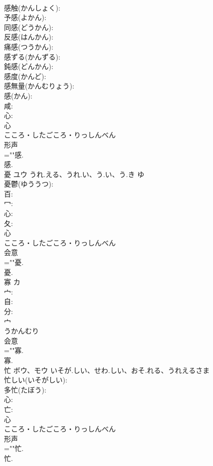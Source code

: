 \documentclass[8pt]{extreport}
\begin{document}
\begin{CJK}{UTF8}{min}
\\	感触(かんしょく): 
\\	予感(よかん): 
\\	同感(どうかん): 
\\	反感(はんかん): 
\\	痛感(つうかん): 
\\	感ずる(かんずる): 
\\	鈍感(どんかん): 
\\	感度(かんど): 
\\	感無量(かんむりょう): 
\\	感(かん): 
\\	咸: 
\\	心: 
\\	心	
\\	こころ・したごころ・りっしんべん	
\\	形声 
\\	=""感.
\\	感.
\\	憂	ユウ	うれ.える、うれ.い、う.い、う.き	ゆ	
\\	憂鬱(ゆううつ): 
\\	百: 
\\	冖: 
\\	心: 
\\	夂: 
\\	心	
\\	こころ・したごころ・りっしんべん	
\\	会意 
\\	=""憂.
\\	憂.
\\	寡	カ			
\\	宀: 
\\	自: 
\\	分: 
\\	宀	
\\	うかんむり	
\\	会意 
\\	=""寡.
\\	寡.
\\	忙	ボウ、モウ	いそが.しい、せわ.しい、おそ.れる、うれえるさま		
\\	忙しい(いそがしい): 
\\	多忙(たぼう): 
\\	心: 
\\	亡: 
\\	心	
\\	こころ・したごころ・りっしんべん	
\\	形声 
\\	=""忙.
\\	忙.

\end{CJK}
\end{document}
